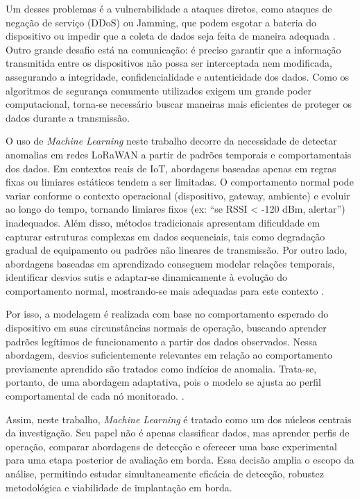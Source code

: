 Um desses problemas é a vulnerabilidade a ataques diretos, como ataques de negação de serviço (DDoS) ou Jamming, que podem esgotar a bateria do dispositivo ou impedir que a coleta de dados seja feita de maneira adequada \cite{hessel2023lorawan}. Outro grande desafio está na comunicação: é preciso garantir que a informação transmitida entre os dispositivos não possa ser interceptada nem modificada, assegurando a integridade, confidencialidade e autenticidade dos dados. Como os algoritmos de segurança comumente utilizados exigem um grande poder computacional, torna-se necessário buscar maneiras mais eficientes de proteger os dados durante a transmissão.


O uso de \textit{Machine Learning} neste trabalho decorre da necessidade de 
detectar anomalias em redes LoRaWAN a partir de padrões temporais e 
comportamentais dos dados. Em contextos reais de IoT, abordagens baseadas 
apenas em regras fixas ou limiares estáticos tendem a ser limitadas. O 
comportamento normal pode variar conforme o contexto operacional (dispositivo, 
gateway, ambiente) e evoluir ao longo do tempo, tornando limiares fixos 
(ex: ``se RSSI < -120 dBm, alertar'') inadequados. Além disso, métodos 
tradicionais apresentam dificuldade em capturar estruturas complexas em dados 
sequenciais, tais como degradação gradual de equipamento ou padrões não 
lineares de transmissão. Por outro lado, abordagens baseadas em aprendizado 
conseguem modelar relações temporais, identificar desvios sutis e adaptar-se 
dinamicamente à evolução do comportamento normal, mostrando-se mais adequadas 
para este contexto \cite{chalapathy2019}.

Por isso, a modelagem é realizada com base no comportamento esperado do dispositivo em suas circunstâncias normais de operação, buscando aprender padrões legítimos de funcionamento a partir dos dados observados. Nessa abordagem, desvios suficientemente relevantes em relação ao comportamento previamente aprendido são tratados como indícios de anomalia. Trata-se, portanto, de uma abordagem adaptativa, pois o modelo se ajusta ao perfil comportamental de cada nó monitorado. \cite{hayashi2022handsfree}.


Assim, neste trabalho, \textit{Machine Learning} é tratado como um dos núcleos centrais da investigação. Seu papel não é apenas classificar dados, mas aprender perfis de operação, comparar abordagens de detecção e oferecer uma base experimental para uma etapa posterior de avaliação em borda. Essa decisão amplia o escopo da análise, permitindo estudar simultaneamente eficácia de detecção, robustez metodológica e viabilidade de implantação em borda.

